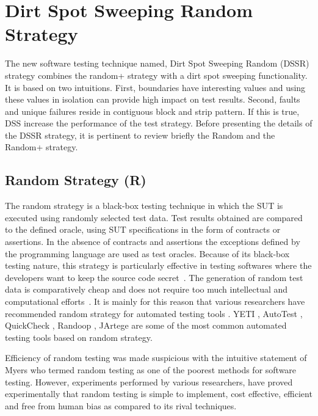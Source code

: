 
\section{Dirt Spot Sweeping Random Strategy}\label{sec:dssr}
The new software testing technique named, Dirt Spot Sweeping Random (DSSR) strategy combines the random+ strategy with a dirt spot sweeping functionality. It is based on two intuitions. First, boundaries have interesting values and using these values in isolation can provide high impact on test results. Second, faults and unique failures reside in contiguous block and strip pattern. If this is true, DSS increase the performance of the test strategy. Before presenting the details of the DSSR strategy, it is pertinent to review briefly the Random and the Random+ strategy.

\subsection{Random Strategy (R)}
The random strategy is a black-box testing technique in which the SUT is executed using randomly selected test data. Test results obtained are compared to the defined oracle, using SUT specifications in the form of contracts or assertions. In the absence of contracts and assertions the exceptions defined by the programming language are used as test oracles. Because of its black-box testing nature, this strategy is particularly effective in testing softwares where the developers want to keep the source code secret~\cite{Chen2010}. The generation of random test data is comparatively cheap and does not require too much intellectual and computational efforts~\cite{Ciupa2009, Ciupa2008}. It is mainly for this reason that various researchers have recommended random strategy for automated testing tools \cite{Ciupa2008a}. YETI \cite{Oriol2010, Oriol2010b}, AutoTest \cite{Leitner2007, Ciupa2007}, QuickCheck \cite{Claessen2000}, Randoop \cite{Pacheco2007}, JArtege \cite{Oriat2004} are some of the most common automated testing tools based on random strategy.

\indent Efficiency of random testing was made suspicious with the intuitive statement of Myers \cite{Myers1979} who termed random testing as one of the poorest methods for software testing. However, experiments performed by various researchers, \cite{Ciupa2007, Duran1981, Duran1984, hamlet1994, Ntafos2001} have proved experimentally that random testing is simple to implement, cost effective, efficient and free from human bias as compared to its rival techniques.


